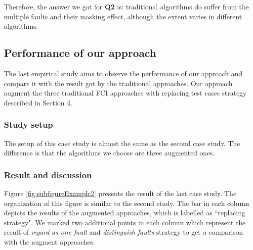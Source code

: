 \documentclass{sig-alternate}
\begin{document}
Therefore, the answer we got for \textbf{Q2} is: traditional algorithms do suffer from the multiple faults and their masking effect, although the extent varies in different algorithms.

\subsection{Performance of our approach}
The last empirical study aims to observe the performance of our approach and compare it with the result got by the traditional approaches. Our approach augment the three traditional FCI approaches with replacing test cases strategy described in Section 4.

\subsubsection{Study setup}
The setup of this case study is almost the same as the second case study. The difference is that the algorithms we choose are three augmented ones.


\subsubsection{Result and discussion}
Figure \ref{fig:subfigureExample2} presents the result of the last case study. The organization of this figure is similar to the second study. The bar in each column depicts the results of the augmented approaches, which is labelled as ``replacing strategy". We marked two additional points in each column which represent the result of \emph{regard as one fault} and \emph{distinguish faults} strategy to get a comparison with the augment approaches.

\end{document}
